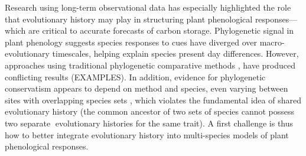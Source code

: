 \documentclass[11pt]{article}
\begin{document}

 
Research using long-term observational data has especially highlighted the role that evolutionary history may play in structuring plant phenological responses---which are critical to accurate forecasts of carbon storage. Phylogenetic signal in plant phenology \citep{kochmer1986constraints,willis2008phylogenetic,davies2013phylogenetic} suggests species responses to cues have diverged over macro-evolutionary timescales, helping explain species present day differences. 
However, approaches using traditional phylogenetic comparative methods \citep[e.g.,][]{willis2008phylogenetic,CaraDonna2015,yang2021afm}, have produced conflicting results (EXAMPLES). In addition, evidence for phylogenetic conservatism appears to depend on method and species, even varying between sites with overlapping species sets \citep[e.g.,][]{rafferty2017global}, which violates the fundamental idea of shared evolutionary history (the common ancestor of two sets of species cannot possess two separate evolutionary histories for the same trait). A first challenge is thus how to better integrate evolutionary history into multi-species models of plant phenological responses.
\end{document}
